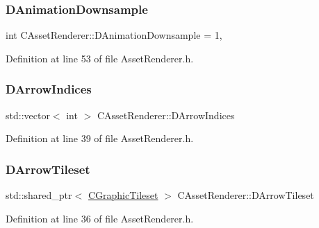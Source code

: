 \subsubsection{\texorpdfstring{D\+Animation\+Downsample}{DAnimationDownsample}}
{\footnotesize\ttfamily int C\+Asset\+Renderer\+::\+D\+Animation\+Downsample = 1\hspace{0.3cm}{\ttfamily [static]}, {\ttfamily [protected]}}



Definition at line 53 of file Asset\+Renderer.\+h.

\hypertarget{classCAssetRenderer_a7bc2bb5c49d9ed462f5d9dec8bc3b939}{}\label{classCAssetRenderer_a7bc2bb5c49d9ed462f5d9dec8bc3b939} 
\subsubsection{\texorpdfstring{D\+Arrow\+Indices}{DArrowIndices}}
{\footnotesize\ttfamily std\+::vector$<$ int $>$ C\+Asset\+Renderer\+::\+D\+Arrow\+Indices\hspace{0.3cm}{\ttfamily [protected]}}



Definition at line 39 of file Asset\+Renderer.\+h.

\hypertarget{classCAssetRenderer_a2aa6a3a0e3ae05b3165f88dcd216ffc6}{}\label{classCAssetRenderer_a2aa6a3a0e3ae05b3165f88dcd216ffc6} 
\subsubsection{\texorpdfstring{D\+Arrow\+Tileset}{DArrowTileset}}
{\footnotesize\ttfamily std\+::shared\+\_\+ptr$<$ \hyperlink{classCGraphicTileset}{C\+Graphic\+Tileset} $>$ C\+Asset\+Renderer\+::\+D\+Arrow\+Tileset\hspace{0.3cm}{\ttfamily [protected]}}



Definition at line 36 of file Asset\+Renderer.\+h.

\hypertarget{classCAssetRenderer_acc2d0fab5a9f1f35a1d5eaf28ff743cc}{}\label{classCAssetRenderer_acc2d0fab5a9f1f35a1d5eaf28ff743cc} 
